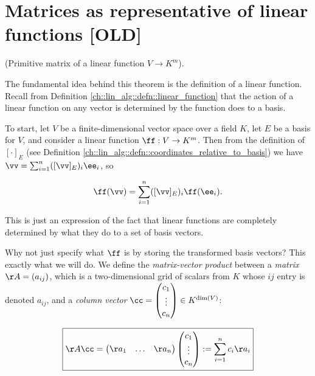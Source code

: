 \section*{Matrices as representative of linear functions [OLD]}

\begin{deriv}
\label{ch::lin_alg::deriv::primitive_matrix}

    (Primitive matrix of a linear function $V \rightarrow K^m$). 
    
    The fundamental idea behind this theorem is the definition of a linear function. Recall from Definition \ref{ch::lin_alg::defn::linear_function} that the action of a linear function on any vector is determined by the function does to a basis.
    
    To start, let $V$ be a finite-dimensional vector space over a field $K$, let $E$ be a basis for $V$, and consider a linear function $\ff:V \rightarrow K^m$. Then from the definition of $[\cdot]_E$ (see Definition \ref{ch::lin_alg::defn::coordinates_relative_to_basis}) we have $\vv = \sum_{i = 1}^n ([\vv]_E)_i \ee_i$, so
    
    \begin{align*}
        \ff(\vv) = \sum_{i = 1}^n ([\vv]_E)_i \ff(\ee_i).
    \end{align*}
    
    This is just an expression of the fact that linear functions are completely determined by what they do to a set of basis vectors.
    
    Why not just specify what $\ff$ is by storing the transformed basis vectors? This exactly what we will do. We define the \textit{matrix-vector product} between a \textit{matrix} $\AA = (a_{ij})$, which is a two-dimensional grid of scalars from $K$ whose $ij$ entry is denoted $a_{ij}$, and a \textit{column vector} $\cc = \begin{pmatrix} c_1 \\ \vdots \\ c_n \end{pmatrix} \in K^{\dim(V)}$:
    
    \begin{align*}
        \boxed
        {
            \AA \cc = 
            \begin{pmatrix} 
                \aa_1 & \hdots & \aa_n
            \end{pmatrix}
            \begin{pmatrix} c_1 \\ \vdots \\ c_n \end{pmatrix}
            :=
            \sum_{i = 1}^n c_i \aa_i
        }
    \end{align*}
    

\end{deriv}
